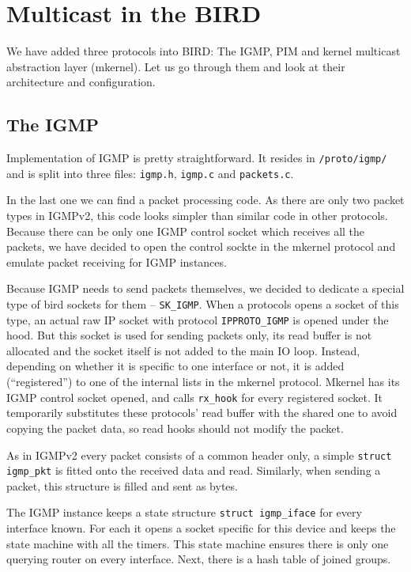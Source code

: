 \chapter{Multicast in the BIRD}

We have added three protocols into BIRD: The IGMP, PIM and kernel multicast
abstraction layer (mkernel). Let us go through them and look at their architecture and configuration.

\section{The IGMP}

Implementation of IGMP is pretty straightforward. It resides in
\texttt{/proto/igmp/} and is split into three files: \texttt{igmp.h},
\texttt{igmp.c} and \texttt{packets.c}.

In the last one we can find a packet processing code. As there are only two
packet types in IGMPv2, this code looks simpler than similar code in other
protocols. Because there can be only one IGMP control socket which receives all
the packets, we have decided to open the control sockte in the mkernel protocol
and emulate packet receiving for IGMP instances.

Because IGMP needs to send packets themselves, we decided to dedicate a special
type of bird sockets for them -- \texttt{SK\_IGMP}. When a protocols opens
a socket of this type, an actual raw IP socket with protocol
\texttt{IPPROTO\_IGMP} is opened under the hood. But this socket is used for
sending packets only, its read buffer is not allocated and the socket itself is
not added to the main IO loop. Instead, depending on whether it is specific to
one interface or not, it is added (``registered'') to one of the internal lists
in the mkernel protocol. Mkernel has its IGMP control socket opened, and calls
\texttt{rx\_hook} for every registered socket. It temporarily substitutes these
protocols' read buffer with the shared one to avoid copying the packet data, so
read hooks should not modify the packet.

As in IGMPv2 every packet consists of a common header only, a simple
\texttt{struct igmp\_pkt} is fitted onto the received data and read. Similarly,
when sending a packet, this structure is filled and sent as bytes.

The IGMP instance keeps a state structure \texttt{struct igmp\_iface} for every
interface known. For each it opens a socket specific for this device and keeps
the state machine with all the timers. This state machine ensures there is only
one querying router on every interface. Next, there is a hash table of joined
groups.

